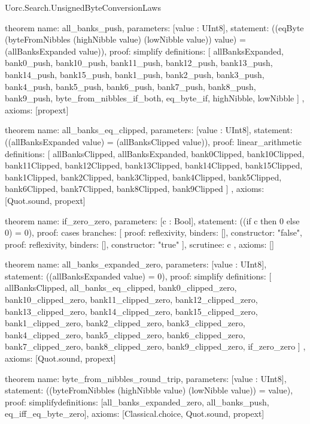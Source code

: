 \begin{lexlean}{Uorc.Search.UnsignedByteConversionLaws}
\begin{semanticmodule}
theorem{
  name: all_banks_push,
  parameters: [value : UInt8],
  statement: ((eqByte (byteFromNibbles (highNibble value) (lowNibble value)) value) = (allBanksExpanded value)),
  proof: simplify{
    definitions: [
      allBanksExpanded,
      bank0_push,
      bank10_push,
      bank11_push,
      bank12_push,
      bank13_push,
      bank14_push,
      bank15_push,
      bank1_push,
      bank2_push,
      bank3_push,
      bank4_push,
      bank5_push,
      bank6_push,
      bank7_push,
      bank8_push,
      bank9_push,
      byte_from_nibbles_if_both,
      eq_byte_if,
      highNibble,
      lowNibble
    ]
  },
  axioms: [propext]
}

theorem{
  name: all_banks_eq_clipped,
  parameters: [value : UInt8],
  statement: ((allBanksExpanded value) = (allBanksClipped value)),
  proof: linear_arithmetic{
    definitions: [
      allBanksClipped,
      allBanksExpanded,
      bank0Clipped,
      bank10Clipped,
      bank11Clipped,
      bank12Clipped,
      bank13Clipped,
      bank14Clipped,
      bank15Clipped,
      bank1Clipped,
      bank2Clipped,
      bank3Clipped,
      bank4Clipped,
      bank5Clipped,
      bank6Clipped,
      bank7Clipped,
      bank8Clipped,
      bank9Clipped
    ]
  },
  axioms: [Quot.sound, propext]
}

theorem{
  name: if_zero_zero,
  parameters: [c : Bool],
  statement: ((if c then 0 else 0) = 0),
  proof: cases{
    branches: [
      {proof: reflexivity{}, binders: [], constructor: "false"},
      {proof: reflexivity{}, binders: [], constructor: "true"}
    ],
    scrutinee: c
  },
  axioms: []
}

theorem{
  name: all_banks_expanded_zero,
  parameters: [value : UInt8],
  statement: ((allBanksExpanded value) = 0),
  proof: simplify{
    definitions: [
      allBanksClipped,
      all_banks_eq_clipped,
      bank0_clipped_zero,
      bank10_clipped_zero,
      bank11_clipped_zero,
      bank12_clipped_zero,
      bank13_clipped_zero,
      bank14_clipped_zero,
      bank15_clipped_zero,
      bank1_clipped_zero,
      bank2_clipped_zero,
      bank3_clipped_zero,
      bank4_clipped_zero,
      bank5_clipped_zero,
      bank6_clipped_zero,
      bank7_clipped_zero,
      bank8_clipped_zero,
      bank9_clipped_zero,
      if_zero_zero
    ]
  },
  axioms: [Quot.sound, propext]
}

theorem{
  name: byte_from_nibbles_round_trip,
  parameters: [value : UInt8],
  statement: ((byteFromNibbles (highNibble value) (lowNibble value)) = value),
  proof: simplify{definitions: [all_banks_expanded_zero, all_banks_push, eq_iff_eq_byte_zero]},
  axioms: [Classical.choice, Quot.sound, propext]
}


\end{semanticmodule}
\end{lexlean}
